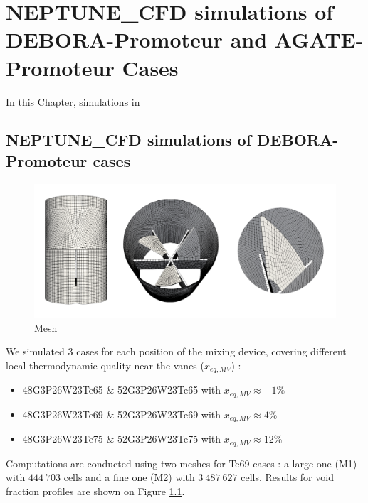 \chapter{NEPTUNE\_CFD simulations of DEBORA-Promoteur and AGATE-Promoteur Cases}
\label{chap:prom_ncfd}

In this Chapter, simulations in 


\section{NEPTUNE\_CFD simulations of DEBORA-Promoteur cases}
\label{sec:debprom_ncfd}



%
\begin{figure}[!h]
\centering
\includegraphics[width=1.0\linewidth]{img/DEBORA-Promoteur/cfd/prom_M2_all.png}
\caption{Mesh}
\label{fig:sim_prom}
\end{figure}
%


We simulated 3 cases for each position of the mixing device, covering different local thermodynamic quality near the vanes ($x_{eq,MV}$) :

\begin{itemize}
\item 48G3P26W23Te65 \& 52G3P26W23Te65 with $x_{eq,MV}\approx -1\%$ 
\item 48G3P26W23Te69 \& 52G3P26W23Te69 with $x_{eq,MV}\approx 4\%$ 
\item 48G3P26W23Te75 \& 52G3P26W23Te75 with $x_{eq,MV}\approx 12\%$ 
\end{itemize}

Computations are conducted using two meshes for Te69 cases : a large one (M1) with $444~703$ cells and a fine one (M2) with $3~487~627$ cells. Results for void fraction profiles are shown on Figure \ref{fig:sim_prom}.


